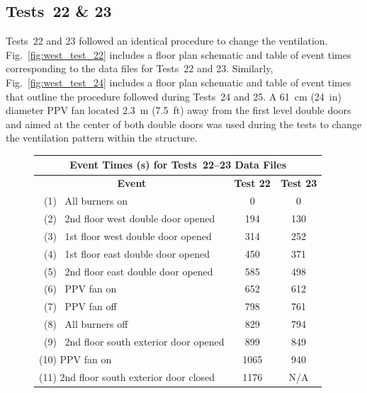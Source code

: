 \documentclass[12pt,oneside]{book}
\begin{document}
\subsection{Tests~22 \& 23}
Tests~22 and 23 followed an identical procedure to change the ventilation. Fig.~\ref{fig:west_test_22} includes a floor plan schematic and table of event times corresponding to the data files for Tests~22 and 23. Similarly, Fig.~\ref{fig:west_test_24} includes a floor plan schematic and table of event times that outline the procedure followed during Tests~24 and 25. A 61~cm (24~in) diameter PPV fan located 2.3~m (7.5~ft) away from the first level double doors and aimed at the center of both double doors was used during the tests to change the ventilation pattern within the structure.
\begin{figure}[!ht]
\begin{minipage}[b]{0.8\columnwidth}
	\begin{flushleft}
	\begin{tabular}{lcc}
	\multicolumn{3}{c}{Event Times (s) for Tests~22--23 Data Files} \\
	\toprule
	\multicolumn{1}{c}{\textbf{Event}} 			& \textbf{Test 22}	& \textbf{Test 23} \\
	\midrule
	~(1)~  All burners on 						&   0	  			&	 0			\\
	~(2)~  2nd floor west double door opened 	&   194		  		&    130		\\
	~(3)~  1st floor west double door opened 	&	314		  		&    252 	 	\\
	~(4)~  1st floor east double door opened 	&   450			  	&    371		\\
	~(5)~  2nd floor east double door opened	&   585			  	&    498		\\
	~(6)~  PPV fan on 							&   652			  	&    612		\\
	~(7)~  PPV fan off              			&   798			  	&    761		\\
	~(8)~  All burners off 						&   829			  	&    794		\\
	~(9)~  2nd floor south exterior door opened &   899			  	&    849		\\
	(10) PPV fan on 	 						&   1065		  	&    940		\\
	(11) 2nd floor south exterior door closed   &   1176		  	&    N/A		\\
	\bottomrule
	\end{tabular}
	\end{flushleft}
\end{minipage}
\begin{minipage}[b]{0.9\columnwidth}

\end{minipage}
\end{figure}
\end{document}
